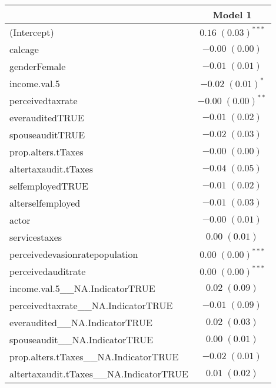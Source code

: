 
\begin{table}
\begin{tabular}{l c }
\hline
 & Model 1 \\
\hline
(Intercept)                                        & $0.16 \; (0.03)^{***}$ \\
calcage                                            & $-0.00 \; (0.00)$      \\
genderFemale                                       & $-0.01 \; (0.01)$      \\
income.val.5                                       & $-0.02 \; (0.01)^{*}$  \\
perceivedtaxrate                                   & $-0.00 \; (0.00)^{**}$ \\
everauditedTRUE                                    & $-0.01 \; (0.02)$      \\
spouseauditTRUE                                    & $-0.02 \; (0.03)$      \\
prop.alters.tTaxes                                 & $-0.00 \; (0.00)$      \\
altertaxaudit.tTaxes                               & $-0.04 \; (0.05)$      \\
selfemployedTRUE                                   & $-0.01 \; (0.02)$      \\
alterselfemployed                                  & $-0.01 \; (0.03)$      \\
actor                                              & $-0.00 \; (0.01)$      \\
servicestaxes                                      & $0.00 \; (0.01)$       \\
perceivedevasionratepopulation                     & $0.00 \; (0.00)^{***}$ \\
perceivedauditrate                                 & $0.00 \; (0.00)^{***}$ \\
income.val.5\_\_NA.IndicatorTRUE                   & $0.02 \; (0.09)$       \\
perceivedtaxrate\_\_NA.IndicatorTRUE               & $-0.01 \; (0.09)$      \\
everaudited\_\_NA.IndicatorTRUE                    & $0.02 \; (0.03)$       \\
spouseaudit\_\_NA.IndicatorTRUE                    & $0.00 \; (0.01)$       \\
prop.alters.tTaxes\_\_NA.IndicatorTRUE             & $-0.02 \; (0.01)$      \\
altertaxaudit.tTaxes\_\_NA.IndicatorTRUE           & $0.01 \; (0.02)$       \\

\end{tabular}
\end{table}
